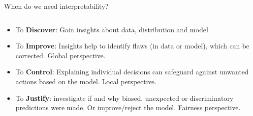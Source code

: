 \documentclass[11pt,compress,t,notes=noshow, aspectratio=169, xcolor=table]{beamer}
\begin{document}
\begin{frame}{When do we need interpretability?}
\begin{columns}[T]
\begin{column}{0.55\textwidth}
\begin{itemize}
  \item To \textbf{Discover}: Gain insights about data, distribution and model
  \item To \textbf{Improve}: Insights help to identify flaws (in data or model), which can be corrected. Global perspective.
  \item To \textbf{Control}: Explaining individual decisions can safeguard against unwanted actions based on the model. Local perspective.\pause 
  \item To \textbf{Justify}: investigate if and why biased, unexpected or discriminatory predictions were made. Or improve/reject the model. 
  Fairness perspective. 
  \pause


\end{itemize}
\end{column}
\end{columns}
\end{frame}
\end{document}
